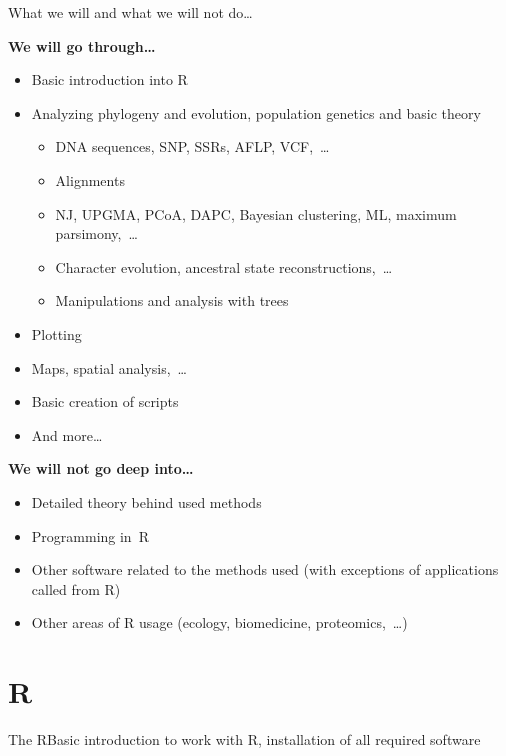 \documentclass[compress, xelatex, 11pt, xcolor=svgnames, aspectratio=169,
	hyperref={
		bookmarks=true,
		unicode=true,
		colorlinks=true,
		pdftitle={Molecular data in R},
		plainpages=false,
		pdfauthor={Vojtech Zeisek},
		pdfsubject={Course about phylogeny and evolution in R},
		pdfcreator={XeLaTeX},
		pdfkeywords={R, evolution, phylogeny, molecular data},
		linkcolor=Crimson, %
		anchorcolor=Magenta, %
		citecolor=Magenta, %
		filecolor=Magenta, %
		menucolor=Magenta, %
		urlcolor=DodgerBlue, %
		},
	url={hyphens, lowtilde} %
	]{beamer}
\begin{document}
\begin{frame}{What we will and what we will not do\ldots}
	\begin{multicols}{2}
		\textbf{We will go through\ldots}
		\begin{itemize}
			\item Basic introduction into R
			\item Analyzing phylogeny and evolution, population genetics and basic theory
			\begin{itemize}
				\item DNA sequences, SNP, SSRs, AFLP, VCF,~\ldots
				\item Alignments
				\item NJ, UPGMA, PCoA, DAPC, Bayesian clustering, ML, maximum parsimony,~\ldots
				\item Character evolution, ancestral state reconstructions,~\ldots
				\item Manipulations and analysis with trees
			\end{itemize}
			\item Plotting
		\columnbreak
			\item Maps, spatial analysis,~\ldots
			\item Basic creation of scripts
			\item And more\ldots
		\end{itemize}
		\textbf{We will not go deep into\ldots}
		\begin{itemize}
			\item Detailed theory behind used methods
			\item Programming in~R
			\item Other software related to the methods used (with exceptions of applications called from R)
			\item Other areas of R usage (ecology, biomedicine, proteomics,~\ldots)
		\end{itemize}
	\end{multicols}
\end{frame}

\section{R}

\begin{frame}{The R}{Basic introduction to work with R, installation of all required software}
	\tableofcontents[currentsection, sectionstyle=show/hide, hideothersubsections]
\end{frame}
\end{document}
